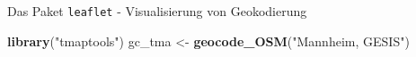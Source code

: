 \documentclass[ignorenonframetext,]{beamer}
\newenvironment{Shaded}{\begin{snugshade}}{\end{snugshade}}
\newcommand{\DataTypeTok}[1]{\textcolor[rgb]{0.74,0.68,0.62}{\underline{#1}}}
\newcommand{\FloatTok}[1]{\textcolor[rgb]{0.27,0.67,0.26}{#1}}
\newcommand{\KeywordTok}[1]{\textcolor[rgb]{0.26,0.66,0.93}{\textbf{#1}}}
\newcommand{\NormalTok}[1]{\textcolor[rgb]{0.74,0.68,0.62}{#1}}
\newcommand{\OperatorTok}[1]{\textcolor[rgb]{0.74,0.68,0.62}{#1}}
\newcommand{\StringTok}[1]{\textcolor[rgb]{0.02,0.61,0.04}{#1}}
\begin{document}
\begin{frame}[fragile]{Das Paket \texttt{leaflet} - Visualisierung von
Geokodierung}
\protect\hypertarget{das-paket-leaflet---visualisierung-von-geokodierung}{}

\begin{Shaded}
\begin{Highlighting}[]
\KeywordTok{library}\NormalTok{(}\StringTok{"tmaptools"}\NormalTok{)}
\NormalTok{gc_tma <-}\StringTok{ }\KeywordTok{geocode_OSM}\NormalTok{(}\StringTok{"Mannheim, GESIS"}\NormalTok{)}
\end{Highlighting}
\end{Shaded}

\begin{Shaded}
\end{Shaded}

\end{frame}
\end{document}
